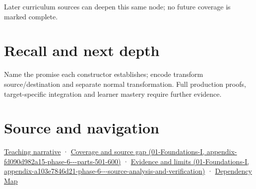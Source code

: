 Later curriculum sources can deepen this same node; no future coverage is marked complete.

\section{Recall and next depth}\label{appendix-380a220e2529-recall-and-next-depth}

Name the promise each constructor establishes; encode transform source/destination and separate normal transformation. Full production proofs, target-specific integration and learner mastery require further evidence.

\section{Source and navigation}\label{appendix-380a220e2529-source-and-navigation}

\href{Continuous\%20Notes/Computing\%20Foundations\%20-\%20From\%20Bits\%20to\%20C++\%20and\%20Systems\%20APIs\#Types\%20can\%20remember\%20the\%20promises\%20that\%20three\%20components\%20forget}{Teaching narrative} · \href{../01-Foundations-I/main.pdf\#nameddest=appendix-fd090d982a15-phase-6---parts-501-600}{Coverage and source gap (01-Foundations-I, appendix-fd090d982a15-phase-6-\/-\/-parts-501-600)} · \href{../01-Foundations-I/main.pdf\#nameddest=appendix-a103e7846d21-phase-6---source-analysis-and-verification}{Evidence and limits (01-Foundations-I, appendix-a103e7846d21-phase-6-\/-\/-source-analysis-and-verification)} · \hyperref[appendix-4ad47bdd269a]{Dependency Map}
